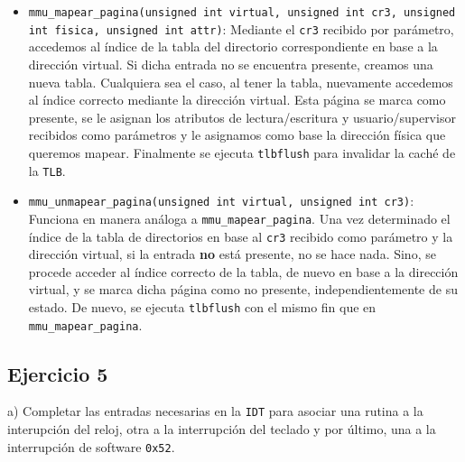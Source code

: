 \begin{itemize}
  
  \item \verb|mmu_mapear_pagina(unsigned int virtual, unsigned int cr3, unsigned int fisica, unsigned int attr)|:
  Mediante el \verb|cr3| recibido por par\'ametro, accedemos al \'indice de la tabla del directorio correspondiente
  en base a la direcci\'on virtual. Si dicha entrada no se encuentra presente, creamos una nueva tabla. Cualquiera
  sea el caso, al tener la tabla, nuevamente accedemos al \'indice correcto mediante la direcci\'on virtual. Esta
  p\'agina se marca como presente, se le asignan los atributos de lectura/escritura y usuario/supervisor recibidos
  como par\'ametros y le asignamos como base la direcci\'on f\'isica que queremos mapear. Finalmente se ejecuta
  \verb|tlbflush| para invalidar la cach\'e de la \verb|TLB|.   

  \item \verb|mmu_unmapear_pagina(unsigned int virtual, unsigned int cr3)|: Funciona en manera an\'aloga a
  \verb|mmu_mapear_pagina|. Una vez determinado el \'indice de la tabla de directorios en base al \verb|cr3| 
  recibido como par\'ametro y la direcci\'on virtual, si la entrada \textbf{no} est\'a presente, no se hace nada. 
  Sino, se procede acceder al \'indice correcto de la tabla, de nuevo en base a la direcci\'on virtual, y se marca dicha 
  p\'agina como no presente, independientemente de su estado. De nuevo, se ejecuta \verb|tlbflush| con el mismo fin 
  que en \verb|mmu_mapear_pagina|.
  

\end{itemize}


\vspace*{0.5cm} \noindent




\newpage





\subsection*{Ejercicio 5}

\vspace*{0.5cm}

\noindent
a) Completar las entradas necesarias en la \verb|IDT| para asociar una rutina a la interupci\'on 
del reloj, otra a la interrupci\'on del teclado y por \'ultimo, una a la interrupci\'on de software \verb|0x52|.

\vspace*{0.3cm}

